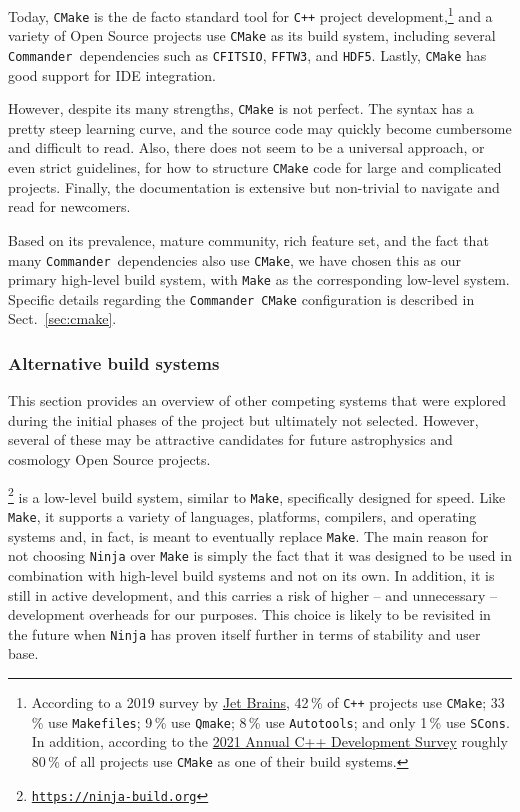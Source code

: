 \documentclass[twocolumn]{aa}
\def\commander{\texttt{Commander}}
\begin{document}
Today, \texttt{CMake} is the de facto standard tool for \texttt{C++} project development,\footnote{According to a 2019 survey by \href{https://www.jetbrains.com/lp/devecosystem-2019/cpp/} {Jet Brains}, 42\,\% of \texttt{C++} projects use \texttt{CMake}; 33\,\% use \texttt{Makefiles}; 9\,\% use \texttt{Qmake}; 8\,\% use \texttt{Autotools}; and only 1\,\% use \texttt{SCons}. In addition, according to the \href{https://isocpp.org/blog/2021/04/results-summary-2021-annual-cpp-developer-survey-lite}{2021 Annual C++ Development Survey} roughly 80\,\% of all projects use \texttt{CMake} as one of their build systems.} and a variety of Open Source projects use \texttt{CMake} as its build system, including several \commander\ dependencies such as \texttt{CFITSIO}, \texttt{FFTW3}, and \texttt{HDF5}. Lastly, \texttt{CMake} has good support for IDE integration.

However, despite its many strengths, \texttt{CMake} is not perfect. The syntax has a pretty steep learning curve, and the source code may quickly become cumbersome and difficult to read. Also, there does not seem to be a universal approach, or even strict guidelines, for how to structure \texttt{CMake} code for large and complicated projects. Finally, the documentation is extensive but non-trivial to navigate and read for newcomers.

Based on its prevalence, mature community, rich feature set, and the fact that many \commander\ dependencies also use \texttt{CMake}, we have chosen this as our primary high-level build system, with \texttt{Make} as the corresponding low-level system. Specific details regarding the \commander\ \texttt{CMake} configuration is described in Sect.~\ref{sec:cmake}.

\subsubsection{Alternative build systems}

This section provides an overview of other competing systems that were explored during the initial phases of the project but ultimately not selected. However, several of these may be attractive candidates for future astrophysics and cosmology Open Source projects.

\footnote{\href{https://ninja-build.org}{\texttt{https://ninja-build.org}}} is a low-level build system, similar to \texttt{Make}, specifically designed for speed. Like \texttt{Make}, it supports a variety of languages, platforms, compilers, and operating systems and, in fact, is meant to eventually replace \texttt{Make}. The main reason for not choosing \texttt{Ninja} over \texttt{Make} is simply the fact that it was designed to be used in combination with high-level build systems and not on its own. In addition, it is still in active development, and this carries a risk of higher -- and unnecessary -- development overheads for our purposes. This choice is likely to be revisited in the future when \texttt{Ninja} has proven itself further in terms of stability and user base.
\end{document}
